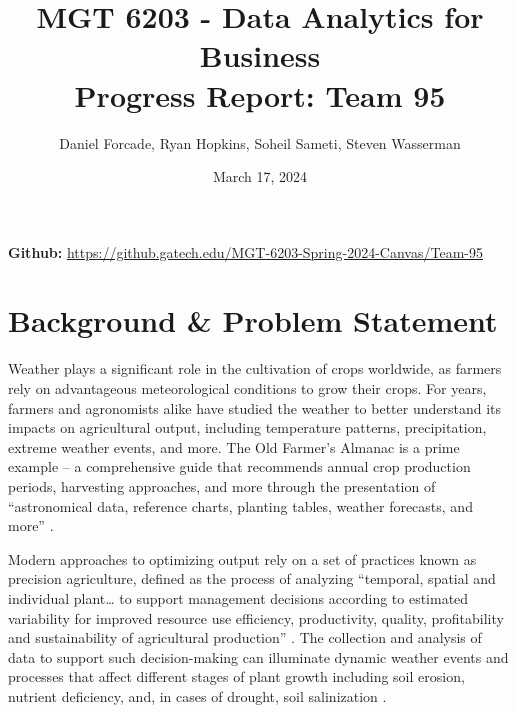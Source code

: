 \documentclass{article}
\title{MGT 6203 - Data Analytics for Business\\Progress Report: Team 95}
\author{Daniel Forcade, Ryan Hopkins, Soheil Sameti, Steven Wasserman\\

}
\date{March 17, 2024}
\begin{document}
\maketitle

\begin{center}
\textbf{Github: }{\url{https://github.gatech.edu/MGT-6203-Spring-2024-Canvas/Team-95 } }
\end{center}




\section{Background \& Problem  Statement}
\label{sec:background}
\hspace{.5cm} Weather plays a significant role in the cultivation of crops worldwide, as farmers rely on advantageous meteorological conditions to grow their crops. For years, farmers and agronomists alike have studied the weather to better understand its impacts on agricultural output, including temperature patterns, precipitation, extreme weather events, and more. The Old Farmer’s Almanac is a prime example – a comprehensive guide that recommends annual crop production periods, harvesting approaches, and more through the presentation of “astronomical data, reference charts, planting tables, weather forecasts, and more” \citep{FineGardening}.

Modern approaches to optimizing output rely on a set of practices known as precision agriculture, defined as the process of analyzing “temporal, spatial and individual plant… to support management decisions according to estimated variability for improved resource use efficiency, productivity, quality, profitability and sustainability of agricultural production” \citep{ISPA}. The collection and analysis of data to support such decision-making can illuminate dynamic weather events and processes that affect different stages of plant growth including soil erosion, nutrient deficiency, and, in cases of drought, soil salinization \citep{EOS}.
\end{document}

